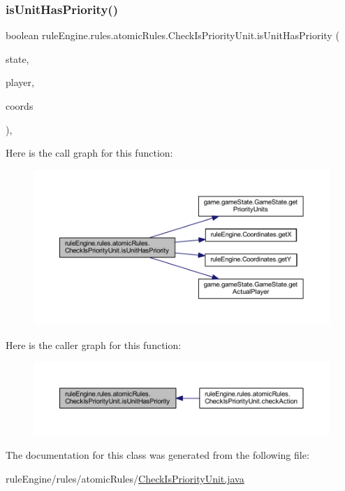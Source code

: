 \subsubsection{\texorpdfstring{is\+Unit\+Has\+Priority()}{isUnitHasPriority()}}
{\footnotesize\ttfamily boolean rule\+Engine.\+rules.\+atomic\+Rules.\+Check\+Is\+Priority\+Unit.\+is\+Unit\+Has\+Priority (\begin{DoxyParamCaption}\item[{\mbox{\hyperlink{classgame_1_1game_state_1_1_game_state}{Game\+State}}}]{state,  }\item[{\mbox{\hyperlink{enumgame_1_1_e_player}{E\+Player}}}]{player,  }\item[{\mbox{\hyperlink{classrule_engine_1_1_coordinates}{Coordinates}}}]{coords }\end{DoxyParamCaption})\hspace{0.3cm}{\ttfamily [inline]}, {\ttfamily [private]}}

Here is the call graph for this function\+:
\nopagebreak
\begin{figure}[H]
\begin{center}
\leavevmode
\includegraphics[width=350pt]{classrule_engine_1_1rules_1_1atomic_rules_1_1_check_is_priority_unit_ab4053d812e96d43c5c89e6919e6796e2_cgraph}
\end{center}
\end{figure}
Here is the caller graph for this function\+:
\nopagebreak
\begin{figure}[H]
\begin{center}
\leavevmode
\includegraphics[width=350pt]{classrule_engine_1_1rules_1_1atomic_rules_1_1_check_is_priority_unit_ab4053d812e96d43c5c89e6919e6796e2_icgraph}
\end{center}
\end{figure}


The documentation for this class was generated from the following file\+:\begin{DoxyCompactItemize}
\item 
rule\+Engine/rules/atomic\+Rules/\mbox{\hyperlink{_check_is_priority_unit_8java}{Check\+Is\+Priority\+Unit.\+java}}\end{DoxyCompactItemize}
